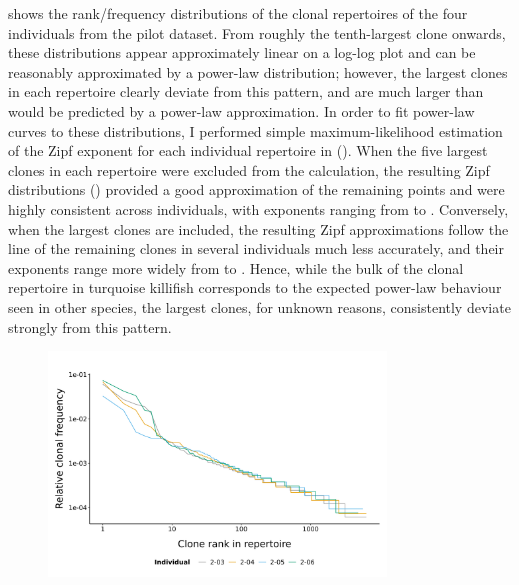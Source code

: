  shows the rank/frequency distributions of the clonal repertoires of the four individuals from the pilot dataset. From roughly the tenth-largest clone onwards, these distributions appear approximately linear on a log-log plot and can be reasonably approximated by a power-law distribution; however, the largest clones in each repertoire clearly deviate from this pattern, and are much larger than would be predicted by a power-law approximation. In order to fit power-law curves to these distributions, I performed simple maximum-likelihood estimation of the Zipf exponent for each individual repertoire in  (). When the five largest clones in each repertoire were excluded from the calculation, the resulting Zipf distributions () provided a good approximation of the remaining points and were highly consistent across individuals, with exponents ranging from  to . Conversely, when the largest clones are included, the resulting Zipf approximations follow the line of the remaining clones in several individuals much less accurately, and their exponents range more widely from  to . Hence, while the bulk of the clonal repertoire in turquoise killifish corresponds to the expected power-law behaviour seen in other species, the largest clones, for unknown reasons, consistently deviate strongly from this pattern.

\begin{figure}
\centering
\includegraphics[width=0.8\textwidth]{_Figures/png/pilot-clones-zipf-lines}
\label{fig:igseq-pilot-clones-zipf-lines}
\end{figure}


